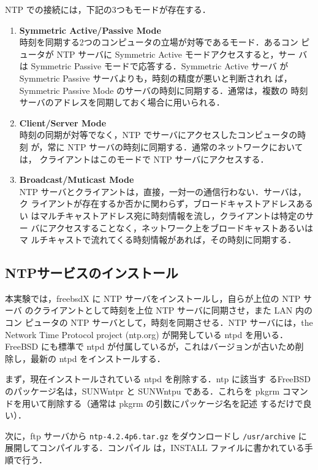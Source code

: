 NTP での接続には，下記の3つもモードが存在する．
 \begin{enumerate}
 \item {\bf Symmetric Active/Passive Mode}\\
   時刻を同期する2つのコンピュータの立場が対等であるモード．あるコン
   ピュータが NTP サーバに Symmetric Active モードアクセスすると，サー
   バは Symmetric Passive モードで応答する．Symmetric Active サーバ
   がSymmetric Passive サーバよりも，時刻の精度が悪いと判断されれ
   ば，Symmetric Passive Mode のサーバの時刻に同期する．通常は，複数の
   時刻サーバのアドレスを同期しておく場合に用いられる．

 \item {\bf Client/Server Mode}\\
   時刻の同期が対等でなく，NTP でサーバにアクセスしたコンピュータの時刻
   が，常に NTP サーバの時刻に同期する．通常のネットワークにおいては，
   クライアントはこのモードで NTP サーバにアクセスする．

 \item {\bf Broadcast/Muticast Mode}\\
   NTP サーバとクライアントは，直接，一対一の通信行わない．サーバは，ク
   ライアントが存在するか否かに関わらず，ブロードキャストアドレスあるい
   はマルチキャストアドレス宛に時刻情報を流し，クライアントは特定のサー
   バにアクセスすることなく，ネットワーク上をブロードキャストあるいはマ
   ルチキャストで流れてくる時刻情報があれば，その時刻に同期する．
 \end{enumerate}

\subsection{NTPサービスのインストール}

本実験では，freebsdX に NTP サーバをインストールし，自らが上位の NTP サーバ
のクライアントとして時刻を上位 NTP サーバに同期させ，また LAN 内のコン
ピュータの NTP サーバとして，時刻を同期させる．NTP サーバには，the
Network Time Protocol project (ntp.org) が開発している ntpd を用いる．
FreeBSD にも標準で ntpd が付属しているが，これはバージョンが古いため削
除し，最新の ntpd をインストールする．

まず，現在インストールされている ntpd を削除する．ntp に該当す
るFreeBSD のパッケージ名は，SUNWntpr と SUNWntpu である．これらを
pkgrm コマンドを用いて削除する（通常は pkgrm の引数にパッケージ名を記述
するだけで良い）．

次に，ftp サーバから \texttt{ntp-4.2.4p6.tar.gz} をダウンロードし
\texttt{/usr/archive} に展開してコンパイルする．コンパイル
は，INSTALL ファイルに書かれている手順で行う．

